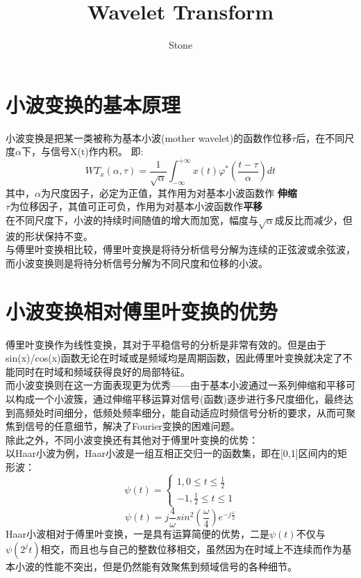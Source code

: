 \documentclass[UTF8]{article}
\author{Stone}
\title{Wavelet Transform}
\begin{document}
\maketitle
\section{小波变换的基本原理}
小波变换是把某一类被称为基本小波(mother wavelet)的函数作位移$\tau$后，在不同尺度$\alpha$下，与信号X(t)作内积。
\newline 即:
\newline
\begin{displaymath}
  WT_{x}(\alpha, \tau) = \frac{1}{\sqrt{\alpha}} \int_{-\infty}^{+\infty} x(t) \varphi^{*} (\frac{t - \tau}{\alpha}) dt
\end{displaymath}
\newline
其中，$\alpha$为尺度因子，必定为正值，其作用为对基本小波函数作 \textbf{伸缩}
\\ $\tau$为位移因子，其值可正可负，作用为对基本小波函数作\textbf{平移}
\\ 在不同尺度下，小波的持续时间随值的增大而加宽，幅度与$\sqrt{\alpha}$成反比而减少，但波的形状保持不变。
\newline
\\ 与傅里叶变换相比较，傅里叶变换是将待分析信号分解为连续的正弦波或余弦波，而小波变换则是将待分析信号分解为不同尺度和位移的小波。
\section{小波变换相对傅里叶变换的优势}
傅里叶变换作为线性变换，其对于平稳信号的分析是非常有效的。但是由于sin(x)/cos(x)函数无论在时域或是频域均是周期函数，因此傅里叶变换就决定了不能同时在时域和频域获得良好的局部特征。
\newline
\\而小波变换则在这一方面表现更为优秀——由于基本小波通过一系列伸缩和平移可以构成一个小波簇，通过伸缩平移运算对信号(函数)逐步进行多尺度细化，最终达到高频处时间细分，低频处频率细分，能自动适应时频信号分析的要求，从而可聚焦到信号的任意细节，解决了Fourier变换的困难问题。
\newline
\\除此之外，不同小波变换还有其他对于傅里叶变换的优势：
\\以Haar小波为例，Haar小波是一组互相正交归一的函数集，即在[0,1]区间内的矩形波：
$$ \psi(t) =\left\{
\begin{aligned}
1 , 0 \leq t \leq \frac{1}{2}\\
-1 , \frac{1}{2} \leq t \leq 1
\end{aligned}
\right.
$$
\begin{displaymath}
  \psi(t) = j\frac{4}{\omega}sin^{2}(\frac{\omega}{4})e^{-j\frac{\omega}{2}}
\end{displaymath}
\newline Haar小波相对于傅里叶变换，一是具有运算简便的优势，二是$\psi(t)$不仅与$\psi(2^{j}t)$相交，而且也与自己的整数位移相交，虽然因为在时域上不连续而作为基本小波的性能不突出，但是仍然能有效聚焦到频域信号的各种细节。
\end{document}

